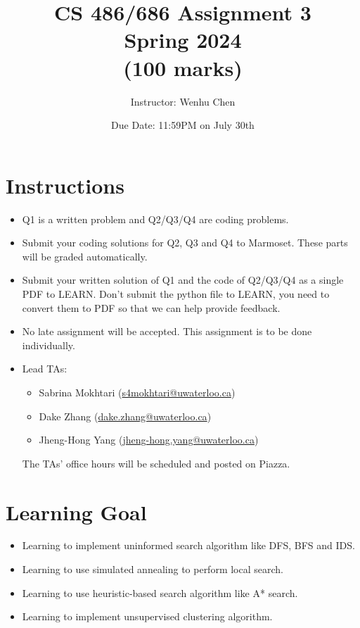 \documentclass[12pt]{article}
\title{CS 486/686 Assignment 3 \\ Spring 2024 \\ (100 marks) }
\author{Instructor: Wenhu Chen}
\date{Due Date: 11:59PM on July 30th}
\begin{document}
\maketitle

\section*{Instructions}

\begin{itemize}
    \item Q1 is a written problem and Q2/Q3/Q4 are coding problems.

    \item Submit your coding solutions for Q2, Q3 and Q4 to Marmoset. These parts will be graded automatically.

    \item Submit your written solution of Q1 and the code of Q2/Q3/Q4 as a single PDF to LEARN. Don't submit the python file to LEARN, you need to convert them to PDF so that we can help provide feedback.

    \item
          No late assignment will be accepted. This assignment is to be done individually.

    \item
          Lead TAs:
          \begin{itemize}
              \item
                    Sabrina Mokhtari (\url{s4mokhtari@uwaterloo.ca})
              \item
                    Dake Zhang (\url{dake.zhang@uwaterloo.ca})
              \item
                    Jheng-Hong Yang (\url{jheng-hong.yang@uwaterloo.ca})
          \end{itemize}
          The TAs' office hours will be scheduled and posted on Piazza.
\end{itemize}

\section*{Learning Goal}
\begin{itemize}
    \item Learning to implement uninformed search algorithm like DFS, BFS and IDS.
    \item Learning to use simulated annealing to perform local search.
    \item Learning to use heuristic-based search algorithm like A* search.
    \item Learning to implement unsupervised clustering algorithm.
\end{itemize}
\end{document}

